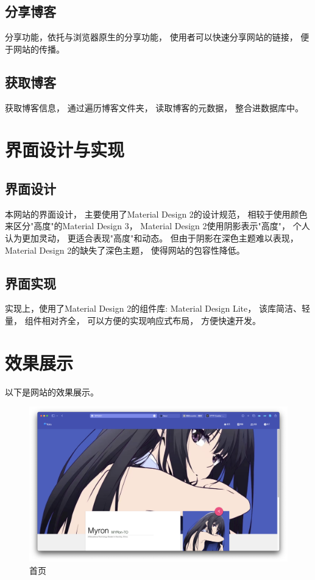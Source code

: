 \documentclass[12pt]{ctexart}
\begin{document}
\subsection{分享博客}
分享功能，依托与浏览器原生的分享功能，
使用者可以快速分享网站的链接，
便于网站的传播。

\subsection{获取博客}
获取博客信息，
通过遍历博客文件夹，
读取博客的元数据，
整合进数据库中。

\section{界面设计与实现}
\subsection{界面设计}
本网站的界面设计，
主要使用了Material Design 2的设计规范，
相较于使用颜色来区分"高度"的Material Design 3，
Material Design 2使用阴影表示"高度"，
个人认为更加灵动，
更适合表现"高度"和动态。
但由于阴影在深色主题难以表现，
Material Design 2的缺失了深色主题，
使得网站的包容性降低。

\subsection{界面实现}
实现上，使用了Material Design 2的组件库:
Material Design Lite，
该库简洁、轻量，
组件相对齐全，
可以方便的实现响应式布局，
方便快速开发。

\section{效果展示}
以下是网站的效果展示。

\begin{figure}[!htb]
	\centering
	\includegraphics[width=1\textwidth]{pics/show_index.png}
	\caption{首页}
	\label{fig:show_index}
\end{figure}
\end{document}
